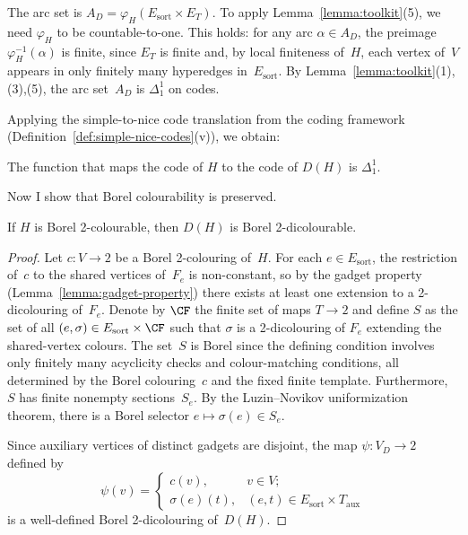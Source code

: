 The arc set is $A_D = \varphi_H(E_{\mathrm{sort}}\times E_T)$.
To apply Lemma~\ref{lemma:toolkit}(5), we need $\varphi_H$ to be countable-to-one.
This holds: for any arc $\alpha\in A_D$, the preimage $\varphi_H^{-1}(\alpha)$ is finite, since $E_T$ is finite and, by local finiteness of~$H$, each vertex of~$V$ appears in only finitely many hyperedges in~$E_{\mathrm{sort}}$.
By Lemma~\ref{lemma:toolkit}(1),(3),(5), the arc set~$A_D$ is $\Delta^1_1$ on codes.

Applying the simple-to-nice code translation from the coding framework (Definition~\ref{def:simple-nice-codes}(v)), we obtain:

\begin{lemma}\label{lem:code-reduction}
	The function that maps the code of $H$ to the code of $D(H)$ is $\Delta^1_1$.
\end{lemma}

Now I show that Borel colourability is preserved.

\begin{claim}\label{claim:forward}
	If $H$ is Borel 2-colourable, then $D(H)$ is Borel 2-dicolourable.
\end{claim}

\begin{proof}
Let $c\colon V\to 2$ be a Borel 2-colouring of~$H$.
For each $e\in E_{\mathrm{sort}}$, the restriction of~$c$ to the shared vertices of~$F_e$ is non-constant, so by the gadget property (Lemma~\ref{lemma:gadget-property}) there exists at least one extension to a 2-dicolouring of~$F_e$.
Denote by $\CF$ the finite set of maps $T\to 2$ and define $S$ as the set of all $(e,\sigma)\in E_{\mathrm{sort}}\times\CF$ such that $\sigma$ is a 2-dicolouring of $F_e$ extending the shared-vertex colours.
The set~$S$ is Borel since the defining condition involves only finitely many acyclicity checks and colour-matching conditions, all determined by the Borel colouring~$c$ and the fixed finite template.
Furthermore, $S$ has finite nonempty sections~$S_e$.
By the Luzin--Novikov uniformization theorem, there is a Borel selector $e\mapsto\sigma(e)\in S_e$.

Since auxiliary vertices of distinct gadgets are disjoint, the map $\psi\colon V_D\to 2$ defined by
$$\psi(v) =\begin{cases}c(v),&v\in V;\\
	\sigma(e)(t),&(e,t)\in E_{\mathrm{sort}}\times T_{\mathrm{aux}}\end{cases}$$
is a well-defined Borel 2-dicolouring of~$D(H)$.
\end{proof}

